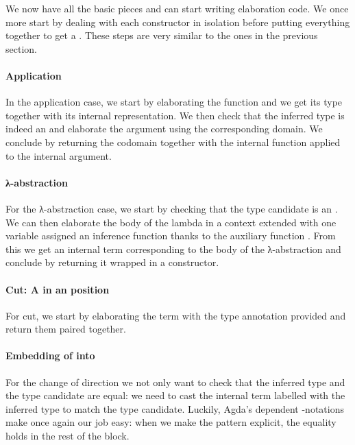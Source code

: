 We now have all the basic pieces and can start writing elaboration code. We
once more start by dealing with each constructor in isolation before putting
everything together to get a . These steps are very similar to
the ones in the previous section.

\paragraph{Application} In the application case, we start by elaborating the
function and we get its type together with its internal representation. We then
check that the inferred type is indeed an  and elaborate the argument
using the corresponding domain. We conclude by returning the codomain together
with the internal function applied to the internal argument.
\paragraph{λ-abstraction} For the λ-abstraction case, we start by checking that
the type candidate is an . We can then elaborate the body of the lambda
in a context extended with one  variable assigned an inference function
thanks to the auxiliary function . From this we get an internal term
corresponding to the body of the λ-abstraction and conclude by returning it wrapped
in a  constructor.
\paragraph{Cut: A  in an  position} For cut, we start by
elaborating the term with the type annotation provided and return them paired
together.
\paragraph{Embedding of  into } For the change of direction
 we not only want to check that the inferred type and the type candidate
are equal: we need to cast the internal term labelled with the inferred type to
match the type candidate. Luckily, Agda's dependent -notations make once
again our job easy: when we make the pattern  explicit, the equality holds
in the rest of the block.

